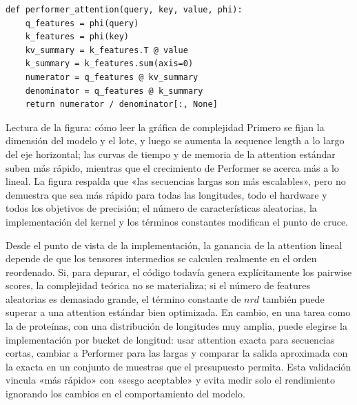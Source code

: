 
\begin{lstlisting}[caption={Orden de cálculo de la attention linealizada (esquema)}]
def performer_attention(query, key, value, phi):
    q_features = phi(query)
    k_features = phi(key)
    kv_summary = k_features.T @ value
    k_summary = k_features.sum(axis=0)
    numerator = q_features @ kv_summary
    denominator = q_features @ k_summary
    return numerator / denominator[:, None]
\end{lstlisting}

\begin{knowledgebox}{Lectura de la figura: cómo leer la gráfica de complejidad}
Primero se fijan la dimensión del modelo y el lote, y luego se aumenta la sequence length a lo largo del eje horizontal; las curvas de tiempo y de memoria de la attention estándar suben más rápido, mientras que el crecimiento de Performer se acerca más a lo lineal. La figura respalda que «las secuencias largas son más escalables», pero no demuestra que sea más rápido para todas las longitudes, todo el hardware y todos los objetivos de precisión; el número de características aleatorias, la implementación del kernel y los términos constantes modifican el punto de cruce.
\end{knowledgebox}

Desde el punto de vista de la implementación, la ganancia de la attention lineal depende de que los tensores intermedios se calculen realmente en el orden reordenado. Si, para depurar, el código todavía genera explícitamente los pairwise scores, la complejidad teórica no se materializa; si el número de features aleatorias es demasiado grande, el término constante de $n r d$ también puede superar a una attention estándar bien optimizada. En cambio, en una tarea como la de proteínas, con una distribución de longitudes muy amplia, puede elegirse la implementación por bucket de longitud: usar attention exacta para secuencias cortas, cambiar a Performer para las largas y comparar la salida aproximada con la exacta en un conjunto de muestras que el presupuesto permita. Esta validación vincula «más rápido» con «sesgo aceptable» y evita medir solo el rendimiento ignorando los cambios en el comportamiento del modelo.


